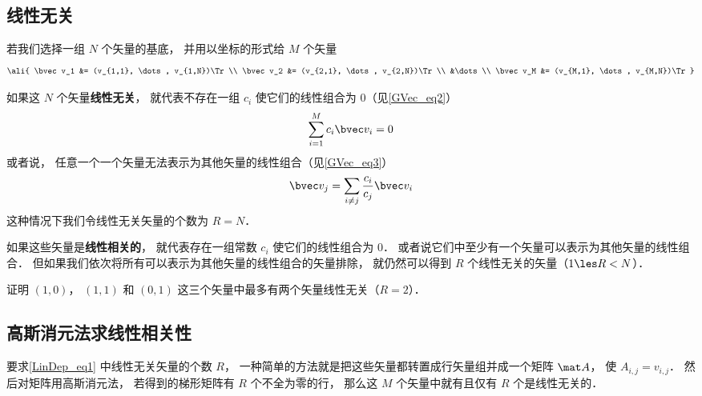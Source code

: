 

\subsection{线性无关}

若我们选择一组 $N$ 个矢量的基底， 并用以坐标的形式给 $M$ 个矢量
\begin{equation}\label{LinDep_eq1}
\ali{
\bvec v_1 &= (v_{1,1}, \dots, v_{1,N})\Tr \\
\bvec v_2 &= (v_{2,1}, \dots, v_{2,N})\Tr \\
&\dots \\
\bvec v_M &= (v_{M,1}, \dots, v_{M,N})\Tr
}\end{equation}

如果这 $N$ 个矢量\textbf{线性无关}， 就代表不存在一组 $c_i$ 使它们的线性组合为 0（见\autoref{GVec_eq2}）
\begin{equation}
\sum_{i=1}^M c_i\bvec v_i = 0
\end{equation}
或者说， 任意一个一个矢量无法表示为其他矢量的线性组合（见\autoref{GVec_eq3}）%
\begin{equation}
\bvec v_j = \sum_{i \ne j}\frac{c_i}{c_j} \bvec v_i
\end{equation}
这种情况下我们令线性无关矢量的个数为 $R = N$．

如果这些矢量是\textbf{线性相关的}， 就代表存在一组常数 $c_i$ 使它们的线性组合为 0． 或者说它们中至少有一个矢量可以表示为其他矢量的线性组合． 但如果我们依次将所有可以表示为其他矢量的线性组合的矢量排除， 就仍然可以得到  $R$ 个线性无关的矢量（$1 \les R < N$）．

\begin{exercise}{}
证明 $(1,0)$， $(1,1)$ 和 $(0,1)$ 这三个矢量中最多有两个矢量线性无关（$R = 2$）．
\end{exercise}

\subsection{高斯消元法求线性相关性}
要求\autoref{LinDep_eq1} 中线性无关矢量的个数 $R$， 一种简单的方法就是把这些矢量都转置成行矢量组并成一个矩阵 $\mat A$， 使 $A_{i,j} = v_{i,j}$． 然后对矩阵用高斯消元法， 若得到的梯形矩阵有 $R$ 个不全为零的行， 那么这 $M$ 个矢量中就有且仅有 $R$ 个是线性无关的．





 